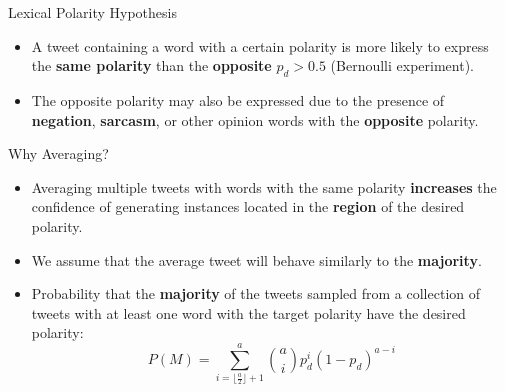 \documentclass[handout]{beamer}
\begin{document}
\begin{frame}{Lexical Polarity Hypothesis}
\begin{scriptsize}
\begin{itemize}

\item A tweet containing a word with a certain polarity is more likely to express the \textbf{same polarity} than the \textbf{opposite} $p_d>0.5$ (Bernoulli experiment).




 \begin{figure}[htb]
\begin{center}
\label{fig:barplots}
\end{center}
\end{figure}

\item The opposite polarity may also be expressed due to the presence of  \textbf{negation}, \textbf{sarcasm}, or other opinion words with the \textbf{opposite} polarity.

\end{itemize}
\end{scriptsize}

\end{frame}


\begin{frame}{Why Averaging?}
\begin{scriptsize}
\begin{itemize}
\item Averaging multiple tweets with words with the same polarity \textbf{increases} the confidence of generating instances located in the \textbf{region} of the desired polarity.
\item We assume that the average tweet will behave similarly to the \textbf{majority}.
\item Probability that the \textbf{majority} of the tweets sampled from a collection of tweets with at least one word with the target polarity have the desired polarity:
\begin{displaymath}
 P(M) = \sum_{i=\lfloor \frac{a}{2}\rfloor +1}^a \binom a i  p_d^i(1-p_d)^{a-i}
\end{displaymath}
         
\begin{table}
\begin{center}
\end{center}
\end{table}
\end{itemize}
\end{scriptsize}
\end{frame}
\end{document}
